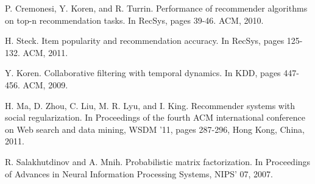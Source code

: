 \documentclass{llncs}
\begin{document}
\begin{thebibliography}{[10]}
		P. Cremonesi, Y. Koren, and R. Turrin. Performance of
		recommender algorithms on top-n recommendation tasks. In
		RecSys, pages 39-46. ACM, 2010.
		
		
		H. Steck. Item popularity and recommendation accuracy. In
		RecSys, pages 125-132. ACM, 2011.
				
       Y. Koren. Collaborative filtering with temporal dynamics. In
		KDD, pages 447-456. ACM, 2009.

         H. Ma, D. Zhou, C. Liu, M. R. Lyu, and I. King.
		Recommender systems with social regularization. In
		Proceedings of the fourth ACM international
		conference on Web search and data mining, WSDM
		'11, pages 287-296, Hong Kong, China, 2011.
		
        R. Salakhutdinov and A. Mnih. Probabilistic matrix
		factorization. In Proceedings of Advances in Neural
		Information Processing Systems, NIPS' 07, 2007.
		
		
		

		
		

		
		
		

\end{thebibliography}
\end{document}

